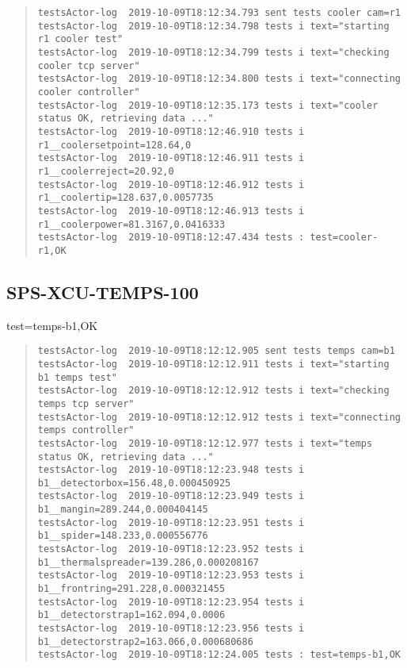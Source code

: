 \begin{quote}
\begin{tiny}
\begin{verbatim}
testsActor-log  2019-10-09T18:12:34.793 sent tests cooler cam=r1
testsActor-log  2019-10-09T18:12:34.798 tests i text="starting r1 cooler test"
testsActor-log  2019-10-09T18:12:34.799 tests i text="checking cooler tcp server"
testsActor-log  2019-10-09T18:12:34.800 tests i text="connecting cooler controller"
testsActor-log  2019-10-09T18:12:35.173 tests i text="cooler status OK, retrieving data ..."
testsActor-log  2019-10-09T18:12:46.910 tests i r1__coolersetpoint=128.64,0
testsActor-log  2019-10-09T18:12:46.911 tests i r1__coolerreject=20.92,0
testsActor-log  2019-10-09T18:12:46.912 tests i r1__coolertip=128.637,0.0057735
testsActor-log  2019-10-09T18:12:46.913 tests i r1__coolerpower=81.3167,0.0416333
testsActor-log  2019-10-09T18:12:47.434 tests : test=cooler-r1,OK
\end{verbatim}
\end{tiny}
\end{quote}

\subsection{SPS-XCU-TEMPS-100}
\label{sec:tc-100}

test=temps-b1,OK

\begin{quote}
\begin{tiny}
\begin{verbatim}
testsActor-log  2019-10-09T18:12:12.905 sent tests temps cam=b1
testsActor-log  2019-10-09T18:12:12.911 tests i text="starting b1 temps test"
testsActor-log  2019-10-09T18:12:12.912 tests i text="checking temps tcp server"
testsActor-log  2019-10-09T18:12:12.912 tests i text="connecting temps controller"
testsActor-log  2019-10-09T18:12:12.977 tests i text="temps status OK, retrieving data ..."
testsActor-log  2019-10-09T18:12:23.948 tests i b1__detectorbox=156.48,0.000450925
testsActor-log  2019-10-09T18:12:23.949 tests i b1__mangin=289.244,0.000404145
testsActor-log  2019-10-09T18:12:23.951 tests i b1__spider=148.233,0.000556776
testsActor-log  2019-10-09T18:12:23.952 tests i b1__thermalspreader=139.286,0.000208167
testsActor-log  2019-10-09T18:12:23.953 tests i b1__frontring=291.228,0.000321455
testsActor-log  2019-10-09T18:12:23.954 tests i b1__detectorstrap1=162.094,0.0006
testsActor-log  2019-10-09T18:12:23.956 tests i b1__detectorstrap2=163.066,0.000680686
testsActor-log  2019-10-09T18:12:24.005 tests : test=temps-b1,OK
\end{verbatim}
\end{tiny}
\end{quote}

